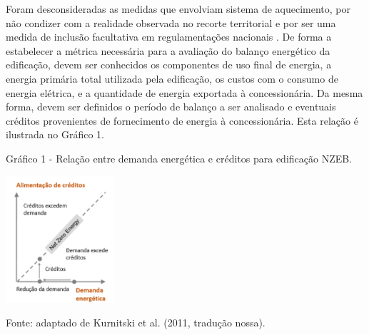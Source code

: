 \noindent Foram desconsideradas as medidas que envolviam sistema de aquecimento, por não condizer 
com a realidade observada no recorte territorial e por ser uma medida de inclusão facultativa 
em regulamentações nacionais \cite{InstitutoNacionaldeMetrologiaNormalizacaoeQualidadeIndustrial-INMETRO2018,InstitutoNacionaldeMetrologiaNormalizacaoeQualidadeIndustrial-INMETRO2018a}.
De forma a estabelecer a métrica necessária para a avaliação do balanço energético da edificação, 
devem ser conhecidos os componentes de uso final de energia, a energia primária total utilizada 
pela edificação, os custos com o consumo de energia elétrica, e a quantidade de energia 
exportada à concessionária. Da mesma forma, devem ser definidos o período de balanço a ser 
analisado e eventuais créditos provenientes de fornecimento de energia à concessionária. 
Esta relação é ilustrada no Gráfico 1.%

    \begin{graph}
        \par \small Gráfico 1 - Relação entre demanda energética e créditos para edificação NZEB.
        \begin{minipage}[ht]{1\textwidth}\centering
            \includegraphics[width=0.3\textwidth]{figures/esquema_iea_2014-2.png}            
        \end{minipage}
        \begin{flushleft}
            \par \small Fonte: adaptado de Kurnitski et al. (2011, tradução nossa).            
        \end{flushleft}
    \end{graph}
